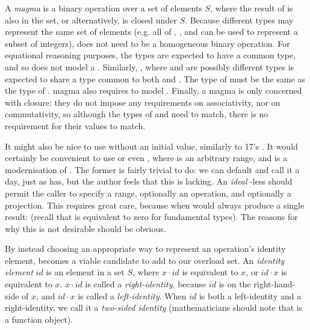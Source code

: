 \begin{itemdescr}
\pnum
A \textit{magma} is a binary operation  over a set of elements $S$, where the result of
 is also in the set, or alternatively,  is closed under
$S$\cite{wikipedia_magma}. Because different types may represent the same set of elements (e.g. all
of , , and  can be used to represent a subset of
integers),  does not need to be a homogeneous binary operation. For equational reasoning
purposes, the types are expected to have a common type, and so  does not
model a . Similarly, , where  and  are possibly
different types is expected to share a type common to both  and . The type of
 must be the same as the type of . magma also requires 
to model . Finally, a magma is only concerned with closure: they do not
impose any requirements on associativity, nor on commutativity, so although the types of
 and  need to match, there is no requirement for their values to
match.
\end{itemdescr}

It might also be nice to use  without an initial value, similarly to \Cpp{}17's
. It would certainly be convenient to use  or
even , where  is an arbitrary range, and
 is a modernisation of . The former is fairly trivial
to do: we can default  and call it a day, just as  has, but
the author feels that this is lacking. An \textit{ideal} -less  should
permit the caller to specify a range, optionally an operation, and optionally a projection. This
requires great care, because  when  would always
produce a single result:  (recall that  is equivalent to zero for
fundamental types). The reasons for why this is not desirable should be obvious.

By instead choosing an appropriate way to represent an operation's identity element,
 becomes a viable candidate to add to our overload set. An
\textit{identity element} $id$ is an element in a set $S$, where $x \cdot id$ is equivalent to $x$,
or $id \cdot x$ is equivalent to $x$. $x \cdot id$ is called a \textit{right-identity}, because $id$
is on the right-hand-side of $x$, and $id \cdot x$ is called a \textit{left-identity}. When $id$ is
both a left-identity and a right-identity, we call it a
\textit{two-sided identity}\cite{wikipedia_identity} (mathematicians should note that
 is a function object).


